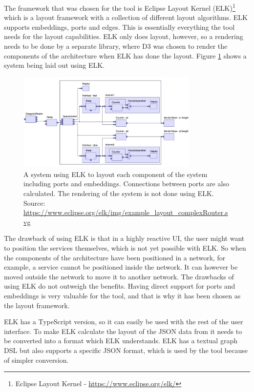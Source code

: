 The framework that was chosen for the tool is Eclipse Layout Kernel (ELK)\footnote{Eclipse Layout Kernel - \url{https://www.eclipse.org/elk/}}
which is a layout framework with a collection of different layout algorithms. ELK supports embeddings, ports and edges. This is essentially everything the tool needs for the layout capabilities.
ELK only does layout, however, so a rendering needs to be done by a separate library, where D3 was chosen to render the components of the architecture when ELK has done the layout.
Figure \ref*{figure:elk_example} shows a system being laid out using ELK.

\begin{figure}[h!]
    \center
    \includegraphics[width=0.80\textwidth]{figures/elk.png}
    \caption{A system using ELK to layout each component of the system including ports and embeddings. Connections between ports are also calculated. The rendering of the system is not done using ELK. Source: \url{https://www.eclipse.org/elk/img/example_layout_complexRouter.svg}}
    \label{figure:elk_example}
\end{figure}

The drawback of using ELK is that in a highly reactive UI, the user might want to position the services themselves, which is not yet possible with ELK.
So when the components of the architecture have been positioned in a network, for example, a service cannot be positioned inside the network. It can however be moved outside the network to move it to another network.
The drawbacks of using ELK do not outweigh the benefits. Having direct support for ports and embeddings is very valuable for the tool, and that is why it has been chosen as the layout framework.

ELK has a TypeScript version, so it can easily be used with the rest of the user interface. To make ELK calculate the layout of the JSON data from \javatoolname[] it needs to be converted into a format which ELK understands.
ELK has a textual graph DSL but also supports a specific JSON format, which is used by the tool because of simpler conversion.

